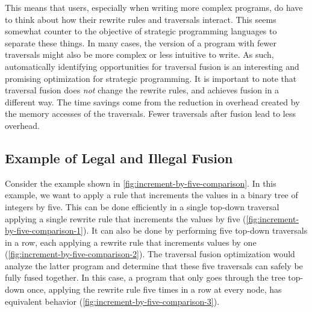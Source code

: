 This means that users, especially when writing more complex programs, do have to think about how their rewrite rules and traversals interact. This seems somewhat counter to the objective of strategic programming languages to separate these things. In many cases, the version of a program with fewer traversals might also be more complex or less intuitive to write. As such, automatically identifying opportunities for traversal fusion is an interesting and promising optimization for strategic programming. It is important to note that traversal fusion does \textit{not} change the rewrite rules, and achieves fusion in a different way. The time savings come from the reduction in overhead created by the memory accesses of the traversals. Fewer traversals after fusion lead to less overhead.

\subsection{Example of Legal and Illegal Fusion}
Consider the example shown in \autoref{fig:increment-by-five-comparison}. In this example, we want to apply a rule that increments the values in a binary tree of integers by five. This can be done efficiently in a single top-down traversal applying a single rewrite rule that increments the values by five (\autoref{fig:increment-by-five-comparison-1}). It can also be done by performing five top-down traversals in a row, each applying a rewrite rule that increments values by one (\autoref{fig:increment-by-five-comparison-2}). The traversal fusion optimization would analyze the latter program and determine that these five traversals can safely be fully fused together. In this case, a program that only goes through the tree top-down once, applying the rewrite rule five times in a row at every node, has equivalent behavior (\autoref{fig:increment-by-five-comparison-3}).

